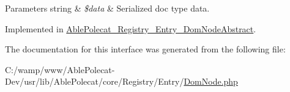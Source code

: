\begin{DoxyParams}[1]{Parameters}
string & {\em \$data} & Serialized doc type data. \\
\hline
\end{DoxyParams}


Implemented in \hyperlink{class_able_polecat___registry___entry___dom_node_abstract_aafcf863b2a7a62d48806270ef03a8c2d}{Able\+Polecat\+\_\+\+Registry\+\_\+\+Entry\+\_\+\+Dom\+Node\+Abstract}.



The documentation for this interface was generated from the following file\+:\begin{DoxyCompactItemize}
\item 
C\+:/wamp/www/\+Able\+Polecat-\/\+Dev/usr/lib/\+Able\+Polecat/core/\+Registry/\+Entry/\hyperlink{_dom_node_8php}{Dom\+Node.\+php}\end{DoxyCompactItemize}
